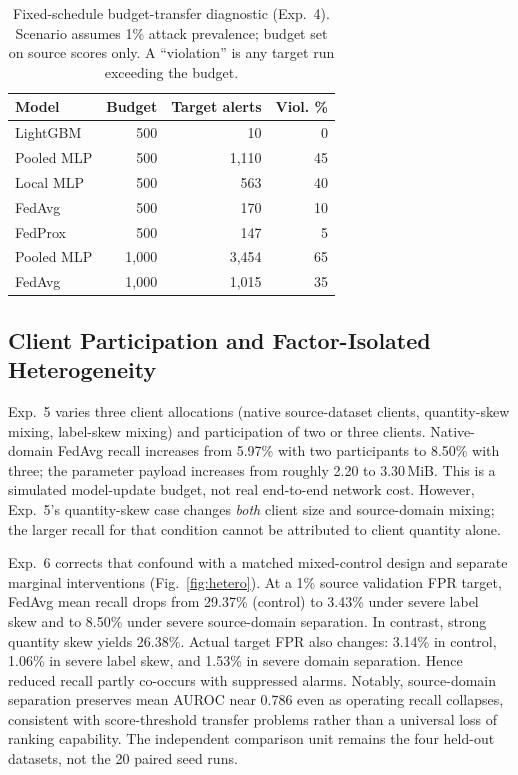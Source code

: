 \documentclass[journal,10pt]{IEEEtran}
\begin{document}
\begin{table}[t]
\centering
\caption{Fixed-schedule budget-transfer diagnostic (Exp.~4). Scenario assumes 1\% attack prevalence; budget set on source scores only. A ``violation'' is any target run exceeding the budget.}
\label{tab:budget}
\scriptsize\setlength{\tabcolsep}{3.2pt}
\begin{tabular}{@{}lrrr@{}}
\toprule
\textbf{Model} & \textbf{Budget} & \textbf{Target alerts} & \textbf{Viol. \%}\\
\midrule
LightGBM & 500 & 10 & 0\\
Pooled MLP & 500 & 1,110 & 45\\
Local MLP & 500 & 563 & 40\\
FedAvg & 500 & 170 & 10\\
FedProx & 500 & 147 & 5\\
Pooled MLP & 1,000 & 3,454 & 65\\
FedAvg & 1,000 & 1,015 & 35\\
\bottomrule
\end{tabular}
\end{table}

\subsection{Client Participation and Factor-Isolated Heterogeneity}
Exp.~5 varies three client allocations (native source-dataset clients, quantity-skew mixing, label-skew mixing) and participation of two or three clients. Native-domain FedAvg recall increases from 5.97\% with two participants to 8.50\% with three; the parameter payload increases from roughly 2.20 to 3.30\,MiB. This is a simulated model-update budget, not real end-to-end network cost. However, Exp.~5's quantity-skew case changes \emph{both} client size and source-domain mixing; the larger recall for that condition cannot be attributed to client quantity alone.

Exp.~6 corrects that confound with a matched mixed-control design and separate marginal interventions (Fig.~\ref{fig:hetero}). At a 1\% source validation FPR target, FedAvg mean recall drops from 29.37\% (control) to 3.43\% under severe label skew and to 8.50\% under severe source-domain separation. In contrast, strong quantity skew yields 26.38\%. Actual target FPR also changes: 3.14\% in control, 1.06\% in severe label skew, and 1.53\% in severe domain separation. Hence reduced recall partly co-occurs with suppressed alarms. Notably, source-domain separation preserves mean AUROC near 0.786 even as operating recall collapses, consistent with score-threshold transfer problems rather than a universal loss of ranking capability. The independent comparison unit remains the four held-out datasets, not the 20 paired seed runs.
\end{document}
